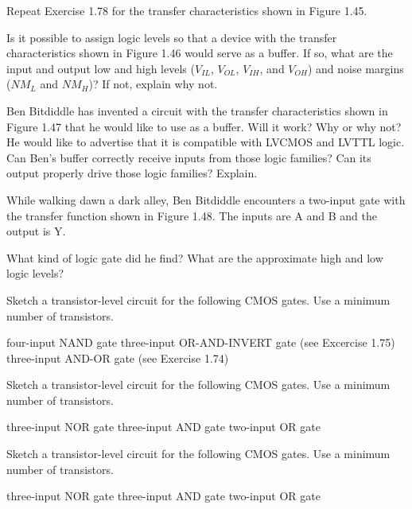 \exercise %
Repeat Exercise 1.78 for the transfer characteristics shown in Figure 1.45.

\exercise %
Is it possible to assign logic levels so that a device with the transfer characteristics shown
in Figure 1.46 would serve as a buffer. If so, what are the input and output low and high
levels ($V_{IL}$, $V_{OL}$, $V_{IH}$, and $V_{OH}$) and noise margins ($NM_L$ and $NM_H$)?
If not, explain why not.

\exercise %
Ben Bitdiddle has invented a circuit with the transfer characteristics shown in Figure 1.47 that
he would like to use as a buffer. Will it work? Why or why not? He would like to advertise that
it is compatible with LVCMOS and LVTTL logic. Can Ben's buffer correctly receive inputs from
those logic families? Can its output properly drive those logic families? Explain.

\exercise %
While walking dawn a dark alley, Ben Bitdiddle encounters a two-input gate with the transfer
function shown in Figure 1.48. The inputs are A and B and the output is Y.
\begin{tasks}
	\task What kind of logic gate did he find?
	\task What are the approximate high and low logic levels?
\end{tasks}

\exercise %
Sketch a transistor-level circuit for the following CMOS gates. Use a minimum number of transistors.
\begin{tasks}
	\task four-input NAND gate
	\task three-input OR-AND-INVERT gate (see Excercise 1.75)
	\task three-input AND-OR gate (see Exercise 1.74)
\end{tasks}

\exercise %
Sketch a transistor-level circuit for the following CMOS gates. Use a minimum number of transistors.
\begin{tasks}
	\task three-input NOR gate
	\task three-input AND gate
	\task two-input OR gate
\end{tasks}

\exercise %
Sketch a transistor-level circuit for the following CMOS gates. Use a minimum number of transistors.
\begin{tasks}
	\task three-input NOR gate
	\task three-input AND gate
	\gate two-input OR gate
\end{tasks}

